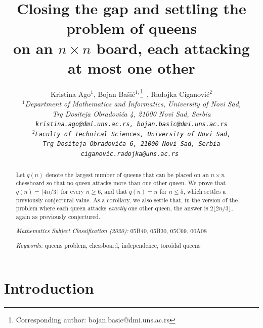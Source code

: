 \documentclass[10pt,a4paper]{article}
\theoremstyle{definition}
\begin{document}
\title{Closing the gap and settling the problem of queens\\ on an $n\times n$ board, each attacking at most one other}
\author{Kristina Ago$^1$, Bojan Ba\v si\'c$^{1,}$\thanks{Corresponding author: bojan.basic@dmi.uns.ac.rs}\ , Radojka Ciganovi\'c$^2$\\[0.5ex]
\em \small $^1$Department of Mathematics and Informatics, University of Novi Sad,\\
\em \small Trg Dositeja Obradovi\'ca 4, 21000 Novi Sad, Serbia\\
\small \tt kristina.ago@dmi.uns.ac.rs, bojan.basic@dmi.uns.ac.rs\\[1ex]
\em \small $^2$Faculty of Technical Sciences, University of Novi Sad,\\
\em \small Trg Dositeja Obradovi\'ca 6, 21000 Novi Sad, Serbia\\
\small \tt ciganovic.radojka@uns.ac.rs
}
\date{}

\maketitle

\begin{abstract}

Let $q(n)$ denote the largest number of queens that can be placed on an
$n\times n$ chessboard so that no queen attacks more than one other queen. We
prove that $q(n)=\lfloor4n/3\rfloor$ for every $n\geqslant6$, and that
$q(n)=n$ for $n\leqslant5$, which settles a previously conjectural value. As a corollary, we also settle that, in the version of the problem where each queen attacks \emph{exactly} one other queen, the answer is $2\lfloor2n/3\rfloor$, again as previously conjectured.

\emph{Mathematics Subject Classification (2020):} 05B40, 05B30, 05C69, 00A08

\emph{Keywords:} queens problem, chessboard, independence, toroidal queens
\end{abstract}

\section{Introduction}
\end{document}
